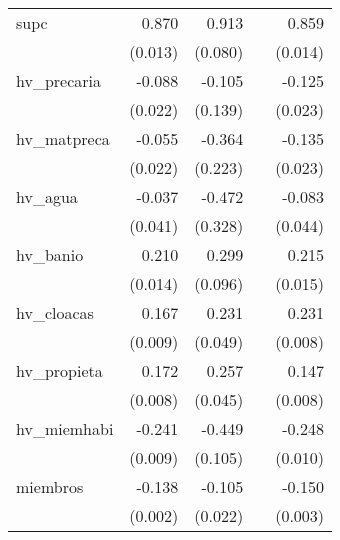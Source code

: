 {\begin{longtable}{l*{4}{D{.}{.}{-1}}}
\addlinespace
supc        &       0.870\sym{***}&       0.913\sym{***}&                     &       0.859\sym{***}\\
            &     (0.013)         &     (0.080)         &                     &     (0.014)         \\
\addlinespace
hv\_precaria &      -0.088\sym{***}&      -0.105         &                     &      -0.125\sym{***}\\
            &     (0.022)         &     (0.139)         &                     &     (0.023)         \\
\addlinespace
hv\_matpreca &      -0.055\sym{*}  &      -0.364         &                     &      -0.135\sym{***}\\
            &     (0.022)         &     (0.223)         &                     &     (0.023)         \\
\addlinespace
hv\_agua     &      -0.037         &      -0.472         &                     &      -0.083         \\
            &     (0.041)         &     (0.328)         &                     &     (0.044)         \\
\addlinespace
hv\_banio    &       0.210\sym{***}&       0.299\sym{**} &                     &       0.215\sym{***}\\
            &     (0.014)         &     (0.096)         &                     &     (0.015)         \\
\addlinespace
hv\_cloacas  &       0.167\sym{***}&       0.231\sym{***}&                     &       0.231\sym{***}\\
            &     (0.009)         &     (0.049)         &                     &     (0.008)         \\
\addlinespace
hv\_propieta &       0.172\sym{***}&       0.257\sym{***}&                     &       0.147\sym{***}\\
            &     (0.008)         &     (0.045)         &                     &     (0.008)         \\
\addlinespace
hv\_miemhabi &      -0.241\sym{***}&      -0.449\sym{***}&                     &      -0.248\sym{***}\\
            &     (0.009)         &     (0.105)         &                     &     (0.010)         \\
\addlinespace
miembros    &      -0.138\sym{***}&      -0.105\sym{***}&                     &      -0.150\sym{***}\\
            &     (0.002)         &     (0.022)         &                     &     (0.003)         \\

\end{longtable}}
